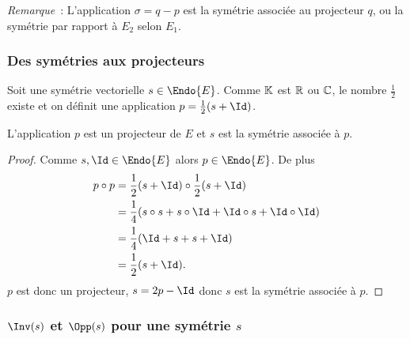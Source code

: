 \emph{Remarque}~: L'application $\sigma=q-p$ est la symétrie associée au projecteur $q$, ou la symétrie par rapport à $E_2$ selon $E_1$.

\subsubsection{Des symétries aux projecteurs}

Soit une symétrie vectorielle $s \in \Endo{E}$. Comme $\mathbb{K}$ est $\mathbb{R}$ ou $\mathbb{C}$, le nombre $\frac{1}{2}$ existe et on définit une application $p = \frac{1}{2}(s+\Id)$.

\begin{prop}
  L'application $p$ est un projecteur de $E$ et $s$ est la symétrie associée à $p$.
\end{prop}
\begin{proof}
  Comme $s, \Id \in \Endo{E}$ alors $p \in \Endo{E}$. De plus
  \begin{align}
    p \circ p &= \frac{1}{2}(s+\Id) \circ \frac{1}{2}(s+\Id) \\
    &=\frac{1}{4}(s \circ s + s\circ \Id +\Id \circ s +\Id \circ \Id)\\
    &=\frac{1}{4}(\Id +s +s+\Id)\\
    &=\frac{1}{2}(s+\Id).
  \end{align}
$p$ est donc un projecteur, $s=2p-\Id$ donc $s$ est la symétrie associée à $p$.
\end{proof}

\subsubsection{$\Inv(s)$ et $\Opp(s)$ pour une symétrie $s$}

